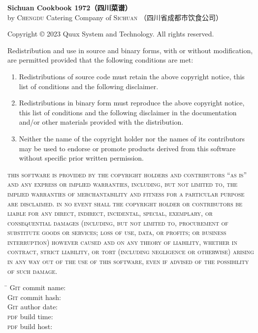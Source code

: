 \begingroup%
\footnotesize%
\setlength{\parindent}{0pt}%
\setlength{\parskip}{.333333\baselineskip}%
\singlespacing%
{\sffamily\bfseries Sichuan Cookbook 1972\!（四川菜谱）}\\
by \textsc{Chengdu} Catering Company of \textsc{Sichuan}\!%
（四川省成都市饮食公司）

\null

Copyright {\copyright} 2023 Quux System and Technology. All rights reserved.

Redistribution and use in source and binary forms, with or without
modification, are permitted provided that the following conditions are met:

\begin{enumerate}
\item Redistributions of source code must retain the above copyright notice,
      this list of conditions and the following disclaimer.

\item Redistributions in binary form must reproduce the above copyright notice,
      this list of conditions and the following disclaimer in the documentation
      and/or other materials provided with the distribution.

\item Neither the name of the copyright holder nor the names of its
      contributors may be used to endorse or promote products derived from
      this software without specific prior written permission.
\end{enumerate}

\textsc{this software is provided by the copyright holders and contributors
``as is'' and any express or implied warranties, including, but not limited to,
the implied warranties of merchantability and fitness for a particular purpose
are disclaimed. in no event shall the copyright holder or contributors be
liable for any direct, indirect, incidental, special, exemplary, or
consequential damages (including, but not limited to, procurement of
substitute goods or services; loss of use, data, or profits; or business
interruption) however caused and on any theory of liability, whether in
contract, strict liability, or tort (including negligence or otherwise)
arising in any way out of the use of this software, even if advised of the
possibility of such damage.}

\vspace{.333333\baselineskip plus .025\baselineskip minus .025\baselineskip}

\begin{tabbing}
\hspace{8.75em}\= \kill
\textsc{Git} commit name: \>\texttt{\gitcommitname}\\
\textsc{Git} commit hash: \>\texttt{\gitcommithash}\\
\textsc{Git} author date: \>\texttt{\gitauthordate}\\
\textsc{pdf} build time:  \>\texttt{\pdfbuildtime}\\
\textsc{pdf} build host:  \>\texttt{\pdfbuildhost}
\end{tabbing}
\vspace{-1\baselineskip}

